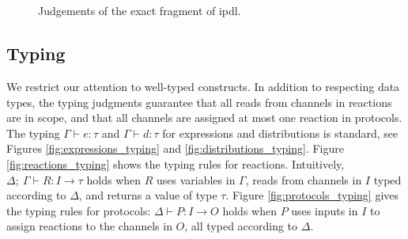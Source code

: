 \begin{figure}[ht]
\begin{syntax}
   \\

   \\

\end{syntax}
\caption{Judgements of the exact fragment of \textsf{ipdl}.}
\label{fig:judgements}
\end{figure}

\subsection{Typing}
We restrict our attention to well-typed \ipdl constructs. In addition to respecting data types, the typing judgments guarantee that all reads from channels in reactions are in scope, and that all channels are assigned at most one reaction in protocols. The typing $\Gamma \vdash e : \tau$ and $\Gamma \vdash d : \tau$ for expressions and distributions is standard, see Figures \ref{fig:expressions_typing} and \ref{fig:distributions_typing}. Figure \ref{fig:reactions_typing} shows the typing rules for reactions. Intuitively, $\Delta; \ \Gamma \vdash R : I \to \tau$ holds when $R$ uses variables in $\Gamma$, reads from channels in $I$ typed according to $\Delta$, and returns a value of type $\tau$. Figure \ref{fig:protocols_typing} gives the typing rules for protocols: $\Delta \vdash P : I \to O$ holds when $P$ uses inputs in $I$ to assign reactions to the channels in $O$, all typed according to $\Delta$.

